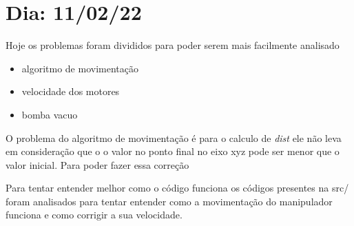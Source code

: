 \chapter{Dia: 11/02/22}
\label{chap:11-02-22}

Hoje os problemas foram divididos para poder serem mais facilmente analisado
\begin{itemize}
    \item algoritmo de movimentação
    \item velocidade dos motores
    \item bomba vacuo
\end{itemize}

O problema do algoritmo de movimentação é para o calculo de \textit{dist} ele não leva em consideração que o o valor no ponto final no eixo xyz pode ser menor que o valor inicial. Para poder fazer essa correção

Para tentar entender melhor como o código funciona os códigos presentes na src/ foram analisados para tentar entender como a movimentação do manipulador funciona e como corrigir a sua velocidade.
